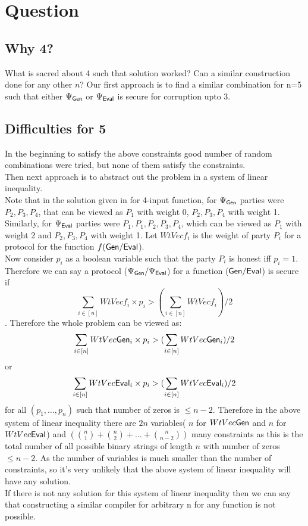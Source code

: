 \section{Question}
\subsection{Why 4?}
What is sacred about 4 such that solution worked? Can a similar construction done for any other $n$? Our first approach is to find a similar combination for n=5 such that either $\Psi_{\mathsf{Gen}}$ or $\Psi_{\mathsf{Eval}}$ is secure for corruption upto 3.
\subsection{Difficulties for 5}
In the beginning to satisfy the above constraints good number of random combinations were tried, but none of them satisfy the constraints.\\ %
Then next approach is to abstract out the problem in a system of linear inequality.\\
Note that in the solution given in \cite{BITMPC} for 4-input function, for $\Psi_{\mathsf{Gen}}$ parties were $P_2,P_3,P_4$, that can be viewed as $P_1$ with weight 0, $P_2,P_3,P_4$ with weight 1. Similarly, for $\Psi_{\mathsf{Eval}}$ parties were $P_1, P_1, P_2,P_3,P_4$, which can be viewed as $P_1$ with weight 2 and $P_2,P_3,P_4$ with weight 1. Let $WtVecf_i$ is the weight of party $P_i$ for a protocol for the function $f(\mathsf{Gen}/\mathsf{Eval}$).\\
Now consider $p_i$ as a boolean variable such that the party $P_i$ is honest iff $p_i=1$. Therefore we can say a protocol ($\Psi_{\mathsf{Gen}}/\Psi_{\mathsf{Eval}}$) for a function ($\mathsf{Gen} /\mathsf{Eval}$) is secure if 
$$ \sum_{i\in[n]} WtVecf_i \times p_i > (\sum_{i\in[n]} WtVecf_i)/2$$.
Therefore the whole problem can be viewed as:
$$ \sum_{i\in[n]} WtVec\mathsf{Gen}_i \times p_i > (\sum_{i\in[n]} WtVec\mathsf{Gen}_i)/2$$ or
$$ \sum_{i\in[n]} WtVec\mathsf{Eval}_i \times p_i > (\sum_{i\in[n]} WtVec\mathsf{Eval}_i)/2$$
for all $(p_1,\ldots, p_n)$ such that number of zeros is $\leq n-2$.
Therefore in the above system of linear inequality there are $2n$ variables( $n$ for $WtVec\mathsf{Gen}$ and $n$ for $WtVec\mathsf{Eval}$) and $(\binom{n}{1} + \binom{n}{2} +  \ldots + \binom{n}{n-2})$ many constraints as this is the total number of all possible binary strings of length $n$ with number of zeros $\leq n-2$.
As the number of variables is much smaller than the number of constraints, so it's very unlikely that the above system of linear inequality will have any solution.\\
If there is not any solution for this system of linear inequality then we can say that constructing a similar compiler for arbitrary n for any function is not possible.\\

